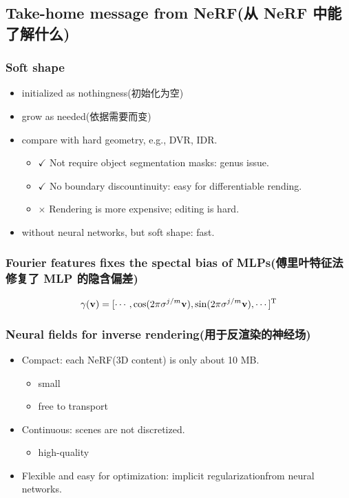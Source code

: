\documentclass[cn,hazy,blue,14pt,screen]{elegantnote}
\begin{document}
\subsection{Take-home message from NeRF(从 NeRF 中能了解什么)}

\subsubsection{Soft shape}

\begin{itemize}
\item initialized as nothingness(初始化为空)
\item grow as needed(依据需要而变)
\item compare with hard geometry, e.g., DVR\cite{niemeyer2020differentiable}, IDR\cite{yariv2020multiview}.
\begin{itemize}
\item $\checkmark$ Not require object segmentation masks: genus issue.
\item $\checkmark$ No boundary discountinuity: easy for differentiable rending.
\item $\times$ Rendering is more expensive; editing is hard.
\end{itemize}
\item without neural networks, but soft shape: fast.\cite{fridovich2022plenoxels}\cite{sun2022direct}
\end{itemize}

\subsubsection{Fourier features fixes the spectal bias of MLPs(傅里叶特征法修复了 MLP 的隐含偏差)}

\[\gamma(\bold{v})=[\cdots,\cos(2\pi\sigma^{j/m}\bold{v}),\sin(2\pi\sigma^{j/m}\bold{v}),\cdots]^{\mathrm{T}}\]

\subsubsection{Neural fields for inverse rendering(用于反渲染的神经场)}

\begin{itemize}
\item Compact: each NeRF(3D content) is only about 10 MB.
\begin{itemize}
\item small
\item free to transport
\end{itemize}
\item Continuous: scenes are not discretized.
\begin{itemize}
\item high-quality
\end{itemize}
\item Flexible and easy for optimization: implicit regularizationfrom neural networks.
\end{itemize}
\end{document}
